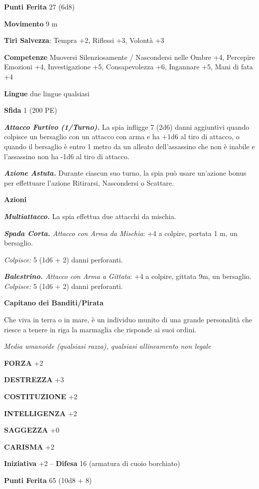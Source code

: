 \begin{multicols}{2}
\textbf{Punti Ferita} 27 (6d8)

\textbf{Movimento} 9 m

\textbf{Tiri Salvezza}: Tempra +2, Riflessi +3, Volontà +3 

\textbf{Competenze} Muoversi Silenziosamente / Nascondersi nelle Ombre +4, Percepire Emozioni +4, Investigazione +5, Consapevolezza +6, Ingannare +5, Mani di fata +4

\textbf{Lingue} due lingue qualsiasi

\textbf{Sfida} 1 (200 PE)

\emph{\textbf{Attacco Furtivo (1/Turno).}} La spia infligge 7 (2d6) danni aggiuntivi quando colpisce un bersaglio con un attacco con arma e ha +1d6 al tiro di attacco, o quando il bersaglio è entro 1 metro da un alleato dell'assassino che non è inabile e l'assassino non ha -1d6 al tiro di attacco.

\emph{\textbf{Azione Astuta.}} Durante ciascun suo turno, la spia può usare un'azione bonus per effettuare l'azione Ritirarsi, Nascondersi o Scattare.

\textbf{Azioni}

\emph{\textbf{Multiattacco.}} La spia effettua due attacchi da mischia.

\emph{\textbf{Spada Corta.} Attacco con Arma da Mischia}: +4 a colpire, portata 1 m, un bersaglio.

\emph{Colpisce:} 5 (1d6 + 2) danni perforanti.

\emph{\textbf{Balestrino.} Attacco con Arma a Gittata}: +4 a colpire, gittata 9m, un bersaglio. \emph{Colpisce:} 5 (1d6 + 2) danni perforanti.


\medskip\textbf{Capitano dei Banditi/Pirata}

Che viva in terra o in mare, è un individuo munito di una grande personalità che riesce a tenere in riga la marmaglia che risponde ai suoi ordini.

\emph{Media umanoide (qualsiasi razza), qualsiasi allineamento non legale}

\textbf{FORZA} +2

\textbf{DESTREZZA} +3

\textbf{COSTITUZIONE} +2

\textbf{INTELLIGENZA} +2

\textbf{SAGGEZZA} +0

\textbf{CARISMA} +2

\textbf{Iniziativa} +2 -- \textbf{Difesa} 16 (armatura di cuoio borchiato)

\textbf{Punti Ferita} 65 (10d8 + 8)


\end{multicols}
